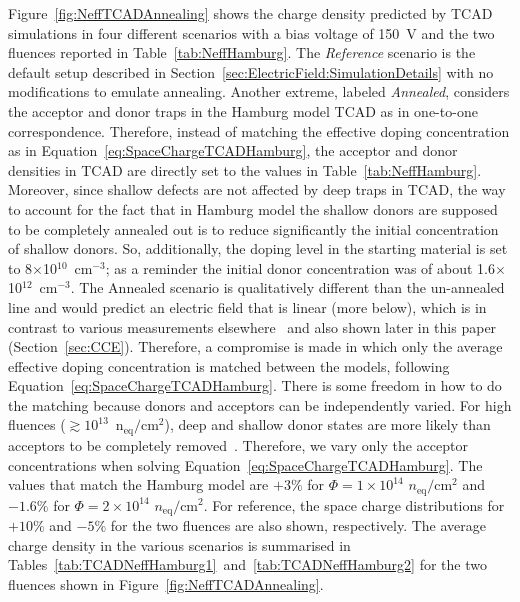 Figure~\ref{fig:NeffTCADAnnealing} shows the charge density predicted by TCAD simulations in four 
different scenarios with a bias voltage of 150~V and the two fluences reported in Table~\ref{tab:NeffHamburg}.  The \textit{Reference} scenario is the default setup described in Section~\ref{sec:ElectricField:SimulationDetails} with no modifications to emulate annealing.  Another extreme, labeled \textit{Annealed}, considers the acceptor and donor traps in the Hamburg model TCAD as in one-to-one correspondence.  Therefore, instead of matching the effective doping concentration as in Equation~\ref{eq:SpaceChargeTCADHamburg}, the acceptor and donor densities in TCAD are directly set to the values in Table~\ref{tab:NeffHamburg}.  Moreover, since shallow defects are not affected by deep traps in TCAD, the way to account for the fact that in Hamburg model the shallow donors are supposed to be completely annealed out is to reduce significantly the initial concentration of shallow donors. So, additionally, the doping level in the starting material is set to 8$\times$10$^{10}$~cm$^{-3}$;  as a reminder the initial donor concentration was of about 1.6$\times$10$^{12}$~cm$^{-3}$.   The Annealed scenario is qualitatively different than the un-annealed line and would predict an electric field that is linear (more below), which is in contrast to various measurements elsewhere~\cite{CHIOCHIA2006} and also shown later in this paper (Section~\ref{sec:CCE}).  Therefore, a compromise is made in which only the average effective doping concentration is matched between the models, following Equation~\ref{eq:SpaceChargeTCADHamburg}.  There is some freedom in how to do the matching because donors and acceptors can be independently varied.  For high fluences 
($\gtrsim10^{13}$~n$_\text{eq}/\text{cm}^{2}$), deep and shallow donor states are more likely than acceptors to be completely removed~\cite{moll-thesis}.  Therefore, we vary only the acceptor concentrations when solving Equation~\ref{eq:SpaceChargeTCADHamburg}.   The values that match the Hamburg model are $+3\%$ for $\Phi=1\times10^{14}$ $n_\text{eq}/\text{cm}^2$ and $-1.6\%$ for $\Phi=2\times10^{14}$ $n_\text{eq}/\text{cm}^2$.  For reference, the space charge distributions for $+10\%$ and $-5\%$ for the two fluences are also shown, respectively.   The average charge density in the various scenarios is summarised in Tables~\ref{tab:TCADNeffHamburg1}~and~\ref{tab:TCADNeffHamburg2} for the two fluences shown in Figure~\ref{fig:NeffTCADAnnealing}.


